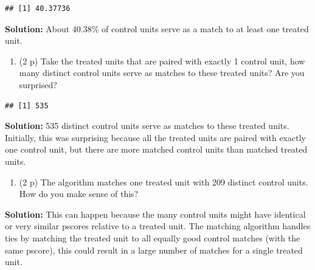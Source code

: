 \documentclass[
]{article}
\newenvironment{Shaded}{\begin{snugshade}}{\end{snugshade}}
\newcommand{\FunctionTok}[1]{\textcolor[rgb]{0.13,0.29,0.53}{\textbf{#1}}}
\newcommand{\NormalTok}[1]{#1}
\newcommand{\OtherTok}[1]{\textcolor[rgb]{0.56,0.35,0.01}{#1}}
\newcommand{\SpecialCharTok}[1]{\textcolor[rgb]{0.81,0.36,0.00}{\textbf{#1}}}
\providecommand{\tightlist}{%
  \setlength{\itemsep}{0pt}\setlength{\parskip}{0pt}}
\begin{document}
\begin{verbatim}
## [1] 40.37736
\end{verbatim}

\textbf{Solution:} About 40.38\% of control units serve as a match to at
least one treated unit.

\begin{enumerate}
\def\labelenumi{\alph{enumi}.}
\setcounter{enumi}{3}
\tightlist
\item
  (2 p) Take the treated units that are paired with exactly 1 control
  unit, how many distinct control units serve as matches to these
  treated units? Are you surprised?
\end{enumerate}

\begin{Shaded}
\end{Shaded}

\begin{verbatim}
## [1] 535
\end{verbatim}

\textbf{Solution:} 535 distinct control units serve as matches to these
treated units. Initially, this was surprising because all the treated
units are paired with exactly one control unit, but there are more
matched control units than matched treated units.

\begin{enumerate}
\def\labelenumi{\alph{enumi}.}
\setcounter{enumi}{4}
\tightlist
\item
  (2 p) The algorithm matches one treated unit with 209 distinct control
  units. How do you make sense of this?
\end{enumerate}

\textbf{Solution:} This can happen because the many control units might
have identical or very similar pscores relative to a treated unit. The
matching algorithm handles ties by matching the treated unit to all
equally good control matches (with the same pscore), this could result
in a large number of matches for a single treated unit.
\end{document}
